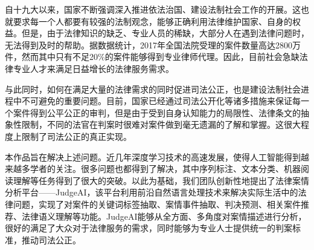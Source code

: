 \begin{cabstract}
  自十九大以来，国家不断强调深入推进依法治国、建设法制社会工作的开展。这也就要求每一个人都要有较强的法制观念，能够正确利用法律维护国家、自身的权益。但是，由于法律知识的缺乏、专业人员的稀缺，大部分人在遇到法律问题时，无法得到及时的帮助。据数据统计，2017年全国法院受理的案件数量高达2800万件，然而其中只有不足20\%的案件能够得到专业律师代理。因此，目前社会急缺法律专业人才来满足日益增长的法律服务需求。
  
	与此同时，如何在满足大量的法律需求的同时促进司法公正，也是建设法制社会进程中不可避免的重要问题。目前，国家已经通过司法公开化等诸多措施来保证每一个案件得到公平公正的审判，但是由于受到自身认知能力的局限性、法律条文的抽象性限制，不同的法官在判案时很难对案件做到毫无遗漏的了解和掌握。这很大程度上限制了司法公正的真正实现。
	
	本作品旨在解决上述问题。近几年深度学习技术的高速发展，使得人工智能得到越来越多学者的关注。很多问题也都得到了解决，其中序列标注、文本分类、机器阅读理解等任务得到了很大的突破。以此为基础，我们团队创新性地提出了法律案情分析平台——JudgeAI，该平台利用前沿自然语言处理技术来解决实际生活中的法律问题，实现了对案件的关键词标签抽取、案情事件抽取、判决预测、相关案件推荐、法律语义理解等功能。JudgeAI能够从全方面、多角度对案情描述进行分析，很好的满足了大众对于法律服务的需求，同时能够为专业人士提供统一的判案标准，推动司法公正。

\end{cabstract}


\begin{eabstract}
	
\end{eabstract}


